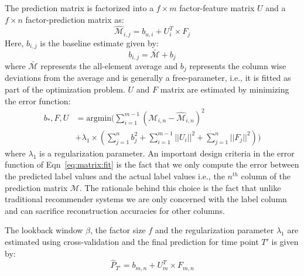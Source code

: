 The prediction matrix is factorized into a $f\times m$ factor-feature matrix $U$ and 
a $f\times n$ factor-prediction matrix as:
\[ \widehat{\mathcal{M}}_{i,j} = b_{u,i} + U^T_i \times F_j\]
Here, $b_{i,j}$ is the baseline estimate given by:
\vspace{-1em}
 \begin{equation}
   \label{eq:baseline}
   b_{i,j} = \bar{\mathcal{M}} + b_j 
 \end{equation}
 where $\bar{\mathcal{M}}$ represents the all-element average and $b_j$ represents 
 the column wise deviations from the average and is generally a free-parameter, i.e.,
it is fitted as part of the optimization problem.
$U$ and $F$ matrix are estimated by minimizing the error function:
\begin{equation}
  \begin{array}{ll}
  \label{eq:matrix:fit}
  b_*, F, U  & =  \textrm{argmin} (\sum \limits_{i=1}^{m-1} \left(\mathcal{M}_{i,n}  - \widehat{\mathcal{M}}_{i,n} \right)^2 \\ 
  & + \lambda_1\times(\sum \limits_{j=1}^{n}b_j^2 + \sum \limits_{i=1}^{m-1} || U_i||^2 + \sum \limits_{j=1}^{n} || F_j||^2))
\end{array}
\end{equation}
\noindent
where $\lambda_1$ is a regularization parameter. An important design criteria in
the error function of Eqn~\ref{eq:matrix:fit} is the fact that we only compute the error
between the predicted label values and the actual label values i.e., the $n^{th}$ column of the prediction 
matrix $\mathcal{M}$. The rationale behind this choice is the fact that unlike traditional recommender 
systems we are only concerned with the label column and can sacrifice reconstruction accuracies for other 
columns. 

The lookback window $\beta$, the factor size $f$ and the regularization parameter $\lambda_1$ 
are estimated using cross-validation
and the final prediction for time point $T'$ is given by:
\[\widehat{P}_{T'} = b_{m,n} + U_m^T \times F_{m,n} \]

